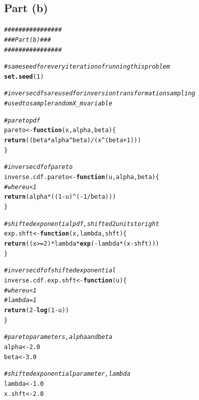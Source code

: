 \documentclass{article}\usepackage[]{graphicx}\usepackage[]{color}
\makeatletter
\newcommand{\hlnum}[1]{\textcolor[rgb]{0.686,0.059,0.569}{#1}}%
\newcommand{\hlcom}[1]{\textcolor[rgb]{0.678,0.584,0.686}{\textit{#1}}}%
\newcommand{\hlopt}[1]{\textcolor[rgb]{0,0,0}{#1}}%
\newcommand{\hlstd}[1]{\textcolor[rgb]{0.345,0.345,0.345}{#1}}%
\newcommand{\hlkwa}[1]{\textcolor[rgb]{0.161,0.373,0.58}{\textbf{#1}}}%
\newcommand{\hlkwb}[1]{\textcolor[rgb]{0.69,0.353,0.396}{#1}}%
\newcommand{\hlkwc}[1]{\textcolor[rgb]{0.333,0.667,0.333}{#1}}%
\newcommand{\hlkwd}[1]{\textcolor[rgb]{0.737,0.353,0.396}{\textbf{#1}}}%
\newenvironment{kframe}{%
 \def\at@end@of@kframe{}%
 \ifinner\ifhmode%
  \def\at@end@of@kframe{\end{minipage}}%
  \begin{minipage}{\columnwidth}%
 \fi\fi%
 \def\FrameCommand##1{\hskip\@totalleftmargin \hskip-\fboxsep
 \colorbox{shadecolor}{##1}\hskip-\fboxsep
     \hskip-\linewidth \hskip-\@totalleftmargin \hskip\columnwidth}%
 \MakeFramed {\advance\hsize-\width
   \@totalleftmargin\z@ \linewidth\hsize
   \@setminipage}}%
 {\par\unskip\endMakeFramed%
 \at@end@of@kframe}
\newenvironment{knitrout}{}{} %
\makeatother
\begin{document}
\subsection{Part (b)}
\begin{knitrout}
\color{fgcolor}\begin{kframe}
\begin{alltt}
\hlcom{################}
\hlcom{### Part (b) ###}
\hlcom{################}

\hlcom{#same seed for every iteration of running this problem}
\hlkwd{set.seed}\hlstd{(}\hlnum{1}\hlstd{)}

\hlcom{#inverse cdfs are used for inversion transformation sampling}
\hlcom{#used to sample random X_m variable}

\hlcom{#pareto pdf}
\hlstd{pareto} \hlkwb{<-} \hlkwa{function}\hlstd{(}\hlkwc{x}\hlstd{,} \hlkwc{alpha}\hlstd{,} \hlkwc{beta}\hlstd{) \{}
  \hlkwd{return}\hlstd{( (beta}\hlopt{*}\hlstd{alpha}\hlopt{^}\hlstd{beta)}\hlopt{/}\hlstd{(x}\hlopt{^}\hlstd{(beta}\hlopt{+}\hlnum{1}\hlstd{)) )}
\hlstd{\}}

\hlcom{#inverse cdf of pareto}
\hlstd{inverse.cdf.pareto} \hlkwb{<-} \hlkwa{function}\hlstd{(}\hlkwc{u}\hlstd{,} \hlkwc{alpha}\hlstd{,} \hlkwc{beta}\hlstd{) \{}
  \hlcom{#where u < 1}
  \hlkwd{return}\hlstd{( alpha}\hlopt{*}\hlstd{((}\hlnum{1} \hlopt{-} \hlstd{u)}\hlopt{^}\hlstd{(}\hlopt{-}\hlnum{1}\hlopt{/}\hlstd{beta)) )}
\hlstd{\}}

\hlcom{#shifted exponential pdf, shifted 2 units to right}
\hlstd{exp.shft} \hlkwb{<-} \hlkwa{function}\hlstd{(}\hlkwc{x}\hlstd{,} \hlkwc{lambda}\hlstd{,} \hlkwc{shft}\hlstd{) \{}
  \hlkwd{return}\hlstd{( (x} \hlopt{>=} \hlnum{2}\hlstd{)} \hlopt{*} \hlstd{lambda} \hlopt{*} \hlkwd{exp}\hlstd{(} \hlopt{-}\hlstd{lambda} \hlopt{*} \hlstd{(x} \hlopt{-} \hlstd{shft) ))}
\hlstd{\}}

\hlcom{#inverse cdf of shifted exponential}
\hlstd{inverse.cdf.exp.shft} \hlkwb{<-} \hlkwa{function}\hlstd{(}\hlkwc{u}\hlstd{) \{}
  \hlcom{#where u < 1}
  \hlcom{#lambda = 1}
  \hlkwd{return}\hlstd{(} \hlnum{2} \hlopt{-} \hlkwd{log}\hlstd{(}\hlnum{1} \hlopt{-} \hlstd{u) )}
\hlstd{\}}

\hlcom{#pareto parameters, alpha and beta}
\hlstd{alpha}  \hlkwb{<-} \hlnum{2.0}
\hlstd{beta}   \hlkwb{<-} \hlnum{3.0}

\hlcom{#shifted exponential parameter, lambda}
\hlstd{lambda} \hlkwb{<-} \hlnum{1.0}
\hlstd{x.shft} \hlkwb{<-} \hlnum{2.0}


\end{alltt}
\end{kframe}
\end{knitrout}
\end{document}
